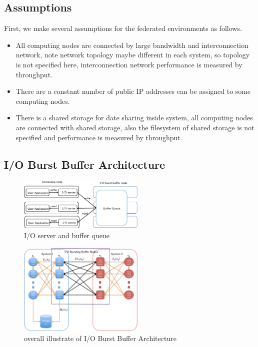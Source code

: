 \subsection{Assumptions}
First, we make several assumptions for the federated environments as follows.
\begin{itemize}
	\item All computing nodes are connected by large bandwidth and interconnection network, note network topology maybe different in each system, so topology is not specified here, interconnection network performance is measured by throughput.
	\item There are a constant number of public IP addresses can be assigned to some computing nodes.
	\item There is a shared storage for date sharing inside system, all computing nodes are connected with shared storage, also the filesystem of shared storage is not specified and performance is measured by throughput.
\end{itemize}

\subsection{I/O Burst Buffer Architecture}

\begin{figure}[tb]
	\centering
	\includegraphics[width=6cm]{../img/IOserver}
	\caption{I/O server and buffer queue}
	\label{I/O server}
\end{figure}

\begin{figure}[tb]
	\centering
	\includegraphics[width=6cm]{../img/overview}
	\caption{overall illustrate of I/O Burst Buffer Architecture}
	\label{overview}
\end{figure}

